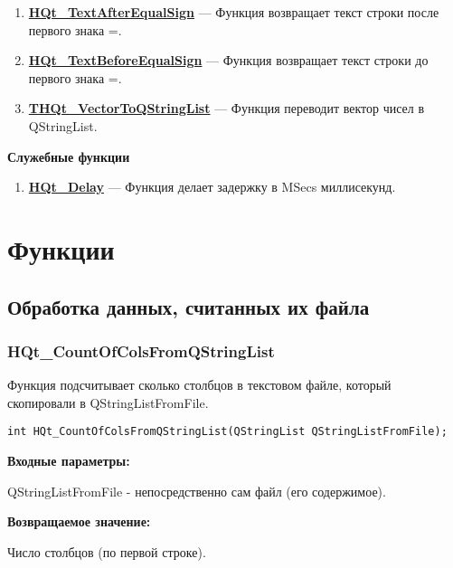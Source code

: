 \documentclass[a4paper,12pt]{article}
\begin{document}
\begin{enumerate}
\item \textbf{\hyperref[HQt_TextAfterEqualSign]{HQt\_TextAfterEqualSign}} --- Функция возвращает текст строки после первого знака =.

\item \textbf{\hyperref[HQt_TextBeforeEqualSign]{HQt\_TextBeforeEqualSign}} --- Функция возвращает текст строки до первого знака =.

\item \textbf{\hyperref[THQt_VectorToQStringList]{THQt\_VectorToQStringList}} --- Функция переводит вектор чисел в QStringList.

\end{enumerate}

\textbf{Служебные функции}
\begin{enumerate}

\item \textbf{\hyperref[HQt_Delay]{HQt\_Delay}} --- Функция делает задержку в MSecs миллисекунд.

\end{enumerate}


\newpage
\section{Функции}
\subsection{Обработка данных, считанных их файла}

\subsubsection{HQt\_CountOfColsFromQStringList}\label{HQt_CountOfColsFromQStringList}

Функция подсчитывает сколько столбцов в текстовом файле, который скопировали в QStringListFromFile.


\begin{lstlisting}[label=code_syntax_HQt_CountOfColsFromQStringList,caption=Синтаксис]
int HQt_CountOfColsFromQStringList(QStringList QStringListFromFile);
\end{lstlisting}

\textbf{Входные параметры:}

QStringListFromFile - непосредственно сам файл (его содержимое).

\textbf{Возвращаемое значение:}

Число столбцов (по первой строке).
\end{document}

